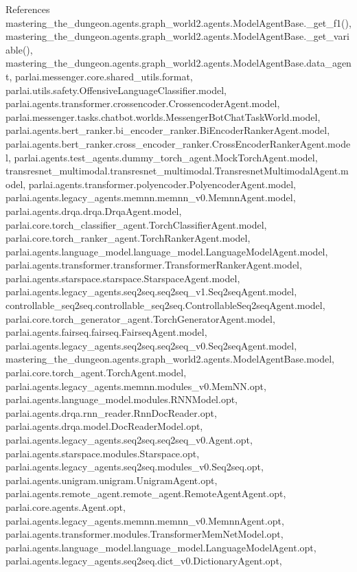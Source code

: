 References mastering\+\_\+the\+\_\+dungeon.\+agents.\+graph\+\_\+world2.\+agents.\+Model\+Agent\+Base.\+\_\+get\+\_\+f1(), mastering\+\_\+the\+\_\+dungeon.\+agents.\+graph\+\_\+world2.\+agents.\+Model\+Agent\+Base.\+\_\+get\+\_\+variable(), mastering\+\_\+the\+\_\+dungeon.\+agents.\+graph\+\_\+world2.\+agents.\+Model\+Agent\+Base.\+data\+\_\+agent, parlai.\+messenger.\+core.\+shared\+\_\+utils.\+format, parlai.\+utils.\+safety.\+Offensive\+Language\+Classifier.\+model, parlai.\+agents.\+transformer.\+crossencoder.\+Crossencoder\+Agent.\+model, parlai.\+messenger.\+tasks.\+chatbot.\+worlds.\+Messenger\+Bot\+Chat\+Task\+World.\+model, parlai.\+agents.\+bert\+\_\+ranker.\+bi\+\_\+encoder\+\_\+ranker.\+Bi\+Encoder\+Ranker\+Agent.\+model, parlai.\+agents.\+bert\+\_\+ranker.\+cross\+\_\+encoder\+\_\+ranker.\+Cross\+Encoder\+Ranker\+Agent.\+model, parlai.\+agents.\+test\+\_\+agents.\+dummy\+\_\+torch\+\_\+agent.\+Mock\+Torch\+Agent.\+model, transresnet\+\_\+multimodal.\+transresnet\+\_\+multimodal.\+Transresnet\+Multimodal\+Agent.\+model, parlai.\+agents.\+transformer.\+polyencoder.\+Polyencoder\+Agent.\+model, parlai.\+agents.\+legacy\+\_\+agents.\+memnn.\+memnn\+\_\+v0.\+Memnn\+Agent.\+model, parlai.\+agents.\+drqa.\+drqa.\+Drqa\+Agent.\+model, parlai.\+core.\+torch\+\_\+classifier\+\_\+agent.\+Torch\+Classifier\+Agent.\+model, parlai.\+core.\+torch\+\_\+ranker\+\_\+agent.\+Torch\+Ranker\+Agent.\+model, parlai.\+agents.\+language\+\_\+model.\+language\+\_\+model.\+Language\+Model\+Agent.\+model, parlai.\+agents.\+transformer.\+transformer.\+Transformer\+Ranker\+Agent.\+model, parlai.\+agents.\+starspace.\+starspace.\+Starspace\+Agent.\+model, parlai.\+agents.\+legacy\+\_\+agents.\+seq2seq.\+seq2seq\+\_\+v1.\+Seq2seq\+Agent.\+model, controllable\+\_\+seq2seq.\+controllable\+\_\+seq2seq.\+Controllable\+Seq2seq\+Agent.\+model, parlai.\+core.\+torch\+\_\+generator\+\_\+agent.\+Torch\+Generator\+Agent.\+model, parlai.\+agents.\+fairseq.\+fairseq.\+Fairseq\+Agent.\+model, parlai.\+agents.\+legacy\+\_\+agents.\+seq2seq.\+seq2seq\+\_\+v0.\+Seq2seq\+Agent.\+model, mastering\+\_\+the\+\_\+dungeon.\+agents.\+graph\+\_\+world2.\+agents.\+Model\+Agent\+Base.\+model, parlai.\+core.\+torch\+\_\+agent.\+Torch\+Agent.\+model, parlai.\+agents.\+legacy\+\_\+agents.\+memnn.\+modules\+\_\+v0.\+Mem\+N\+N.\+opt, parlai.\+agents.\+language\+\_\+model.\+modules.\+R\+N\+N\+Model.\+opt, parlai.\+agents.\+drqa.\+rnn\+\_\+reader.\+Rnn\+Doc\+Reader.\+opt, parlai.\+agents.\+drqa.\+model.\+Doc\+Reader\+Model.\+opt, parlai.\+agents.\+legacy\+\_\+agents.\+seq2seq.\+seq2seq\+\_\+v0.\+Agent.\+opt, parlai.\+agents.\+starspace.\+modules.\+Starspace.\+opt, parlai.\+agents.\+legacy\+\_\+agents.\+seq2seq.\+modules\+\_\+v0.\+Seq2seq.\+opt, parlai.\+agents.\+unigram.\+unigram.\+Unigram\+Agent.\+opt, parlai.\+agents.\+remote\+\_\+agent.\+remote\+\_\+agent.\+Remote\+Agent\+Agent.\+opt, parlai.\+core.\+agents.\+Agent.\+opt, parlai.\+agents.\+legacy\+\_\+agents.\+memnn.\+memnn\+\_\+v0.\+Memnn\+Agent.\+opt, parlai.\+agents.\+transformer.\+modules.\+Transformer\+Mem\+Net\+Model.\+opt, parlai.\+agents.\+language\+\_\+model.\+language\+\_\+model.\+Language\+Model\+Agent.\+opt, parlai.\+agents.\+legacy\+\_\+agents.\+seq2seq.\+dict\+\_\+v0.\+Dictionary\+Agent.\+opt, 
